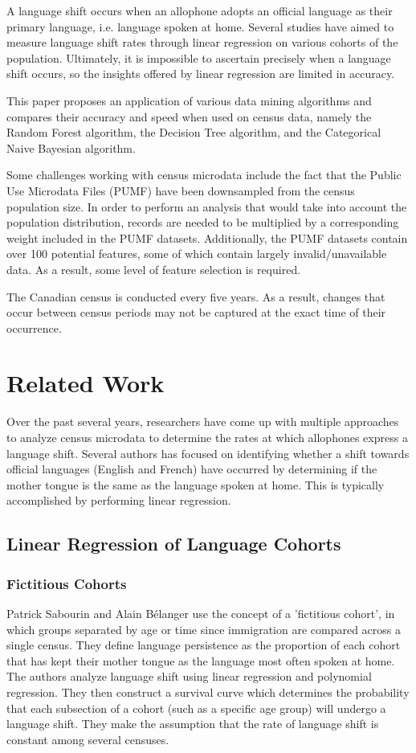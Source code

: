 \documentclass[10pt, conference, compsocconf]{IEEEtran}
\begin{document}
A language shift occurs when an allophone adopts an official language as their primary language, i.e. language spoken at home. Several studies have aimed to measure language shift rates through linear regression on various cohorts of the population. Ultimately, it is impossible to ascertain precisely when a language shift occurs, so the insights offered by linear regression are limited in accuracy.

This paper proposes an application of various data mining algorithms and compares their accuracy and speed when used on census data, namely the Random Forest algorithm, the Decision Tree algorithm, and the Categorical Naive Bayesian algorithm.

Some challenges working with census microdata include the fact that the Public Use Microdata Files (PUMF) have been downsampled from the census population size. In order to perform an analysis that would take into account the population distribution, records are needed to be multiplied by a corresponding weight included in the PUMF datasets. Additionally, the PUMF datasets contain over 100 potential features, some of which contain largely invalid/unavailable data. As a result, some level of feature selection is required.

The Canadian census is conducted every five years. As a result, changes that occur between census periods may not be captured at the exact time of their occurrence.


\section{Related Work}
Over the past several years, researchers have come up with multiple approaches to analyze census microdata to determine the rates at which allophones express a language shift. Several authors has focused on identifying whether a  shift towards official languages (English and French) have occurred by determining if the mother tongue is the same as the language spoken at home. This is typically accomplished by performing linear regression.

\subsection{Linear Regression of Language Cohorts}
\subsubsection{Fictitious Cohorts}
Patrick Sabourin and Alain Bélanger use the concept of a 'fictitious cohort', in which groups separated by age or time since immigration are compared across a single census. They define language persistence as the proportion of each cohort that has kept their mother tongue as the language most often spoken at home. The authors analyze language shift using linear regression and polynomial regression. They then construct a survival curve which determines the probability that each subsection of a cohort (such as a specific age group) will undergo a language shift. They make the assumption that the rate of language shift is constant among several censuses.
\cite{dynamics1}
\end{document}
